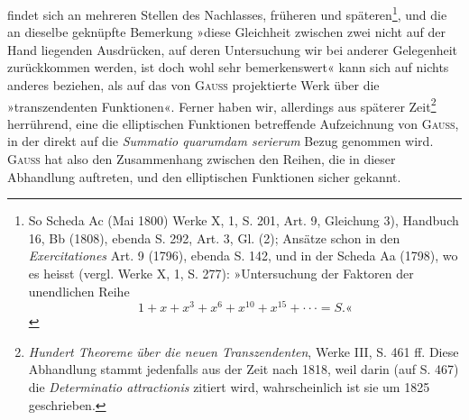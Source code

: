 findet sich an mehreren Stellen des Nachlasses, früheren und späteren\footnote{So Scheda Ac (Mai 1800) Werke X, 1, S. 201, Art. 9, Gleichung 3), Handbuch 16, Bb (1808), ebenda S. 292, Art. 3, Gl. (2); Ansätze schon in den \textit{Exercitationes} Art. 9 (1796), ebenda S. 142, und in der Scheda Aa (1798), wo es heisst (vergl. Werke X, 1, S. 277): »Untersuchung der Faktoren der unendlichen Reihe
\[
1+x+x^3+x^6+x^{10}+x^{15}+\cdot\cdot\cdot=S.\text{«}
\]
}, und
die an dieselbe geknüpfte Bemerkung »diese Gleichheit zwischen zwei nicht
auf der Hand liegenden Ausdrücken, auf deren Untersuchung wir bei anderer
Gelegenheit zurückkommen werden, ist doch wohl sehr bemerkenswert« kann
sich auf nichts anderes beziehen, als auf das von \textsc{Gauss} projektierte Werk
über die »transzendenten Funktionen«. Ferner haben wir, allerdings aus
späterer Zeit\footnote{\textit{Hundert Theoreme über die neuen Transzendenten}, Werke III, S. 461 ff. Diese Abhandlung stammt jedenfalls aus der Zeit nach 1818, weil darin (auf S. 467) die \textit{Determinatio attractionis} zitiert wird, wahrscheinlich ist sie um 1825 geschrieben.} herrührend, eine die elliptischen Funktionen betreffende Aufzeichnung
von \textsc{Gauss}, in der direkt auf die \textit{Summatio quarumdam serierum} Bezug
genommen wird. \textsc{Gauss} hat also den Zusammenhang zwischen den Reihen,
die in dieser Abhandlung auftreten, und den elliptischen Funktionen sicher
gekannt.


